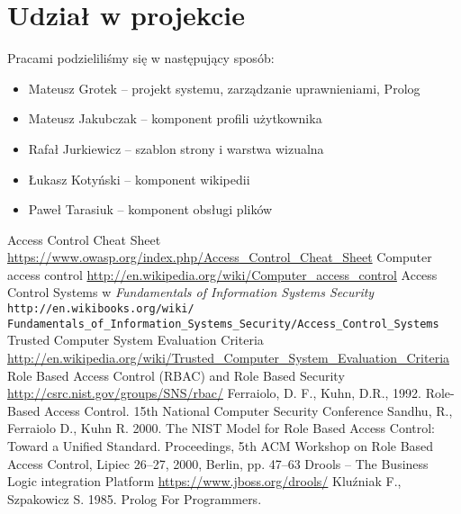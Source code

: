 \documentclass{classrep}
\begin{document}
\section{Udział w projekcie}
Pracami podzieliliśmy się w następujący sposób:
\begin{itemize}
\item Mateusz Grotek -- projekt systemu, zarządzanie uprawnieniami, Prolog
\item Mateusz Jakubczak -- komponent profili użytkownika
\item Rafał Jurkiewicz -- szablon strony i warstwa wizualna
\item Łukasz Kotyński -- komponent wikipedii
\item Paweł Tarasiuk -- komponent obsługi plików
\end{itemize}

\begin{thebibliography}{10}
Access Control Cheat Sheet \url{https://www.owasp.org/index.php/Access\_Control\_Cheat\_Sheet}
Computer access control \url{http://en.wikipedia.org/wiki/Computer\_access\_control}
Access Control Systems w \textsl{Fundamentals of Information Systems Security} \texttt{http://en.wikibooks.org/wiki/\\Fundamentals\_of\_Information\_Systems\_Security/Access\_Control\_Systems}
Trusted Computer System Evaluation Criteria \url{http://en.wikipedia.org/wiki/Trusted\_Computer\_System\_Evaluation\_Criteria}
Role Based Access Control (RBAC) and Role Based Security \url{http://csrc.nist.gov/groups/SNS/rbac/}
Ferraiolo, D. F., Kuhn, D.R., 1992. Role-Based Access Control. 15th National Computer Security Conference
Sandhu, R., Ferraiolo D., Kuhn R. 2000. The NIST Model for  Role Based Access Control:  Toward a Unified Standard. 
Proceedings, 5th ACM Workshop on Role Based Access Control, Lipiec 26--27, 2000, Berlin, pp. 47--63 
Drools -- The Business Logic integration Platform \url{https://www.jboss.org/drools/}
Kluźniak F., Szpakowicz S. 1985. Prolog For Programmers.
\end{thebibliography}
\end{document}
